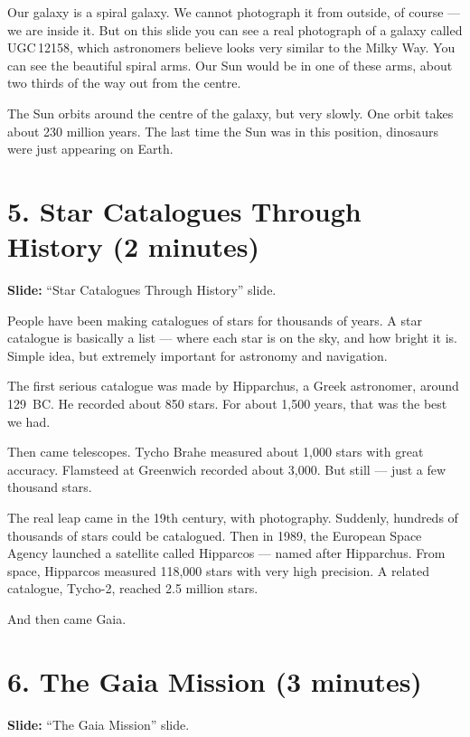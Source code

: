 \documentclass[10pt,a4paper]{article}
\newenvironment{slidenote}
  {\begin{mdframed}[linecolor=green!50!black, backgroundcolor=green!5, linewidth=1pt]%
   \small\color{green!40!black}\textbf{Slide:} }
  {\end{mdframed}}
\begin{document}
Our galaxy is a spiral galaxy. We cannot photograph it from outside, of course --- we are inside it. But on this slide you can see a real photograph of a galaxy called UGC\,12158, which astronomers believe looks very similar to the Milky Way. You can see the beautiful spiral arms. Our Sun would be in one of these arms, about two thirds of the way out from the centre.

The Sun orbits around the centre of the galaxy, but very slowly. One orbit takes about 230 million years. The last time the Sun was in this position, dinosaurs were just appearing on Earth.

\section*{5. Star Catalogues Through History (2 minutes)}

\begin{slidenote}
``Star Catalogues Through History'' slide.
\end{slidenote}

People have been making catalogues of stars for thousands of years. A star catalogue is basically a list --- where each star is on the sky, and how bright it is. Simple idea, but extremely important for astronomy and navigation.

The first serious catalogue was made by Hipparchus, a Greek astronomer, around 129~BC. He recorded about 850 stars. For about 1,500 years, that was the best we had.

Then came telescopes. Tycho Brahe measured about 1,000 stars with great accuracy. Flamsteed at Greenwich recorded about 3,000. But still --- just a few thousand stars.

The real leap came in the 19th century, with photography. Suddenly, hundreds of thousands of stars could be catalogued. Then in 1989, the European Space Agency launched a satellite called Hipparcos --- named after Hipparchus. From space, Hipparcos measured 118,000 stars with very high precision. A related catalogue, Tycho-2, reached 2.5 million stars.

And then came Gaia.

\section*{6. The Gaia Mission (3 minutes)}

\begin{slidenote}
``The Gaia Mission'' slide.
\end{slidenote}
\end{document}
